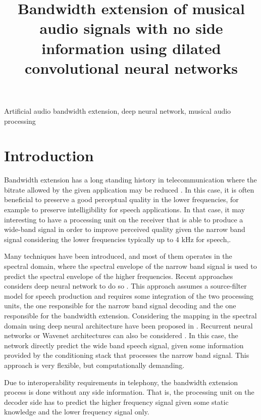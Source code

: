 \documentclass{article}
\title{Bandwidth extension of musical audio signals with no side information using dilated convolutional neural networks}
\begin{document}
%
\maketitle
%
\begin{abstract}

\end{abstract}
%
\begin{keywords}
Artificial audio bandwidth extension, deep neural network, musical audio processing
\end{keywords}
%
\section{Introduction}
\label{sec:intro}

Bandwidth extension has a long standing history in telecommunication where the bitrate allowed by the given application may be reduced \cite{larsen2005audio}. In this case, it is often beneficial to preserve a good perceptual quality in the lower frequencies, for example to preserve intelligibility for speech applications. In that case, it may interesting to have a processing unit on the receiver that is able to produce a wide-band signal in order to improve perceived quality given the narrow band signal considering the lower frequencies typically up to 4 kHz for speech,.

Many techniques have been introduced, and most of them operates in the spectral domain, where the spectral envelope of the narrow band signal is used to predict the spectral envelope of the higher frequencies. Recent approaches considers deep neural network to do so \cite{abel2017artificial}. This approach assumes a source-filter model for speech production and requires some integration of the two processing units, the one responsible for the narrow band signal decoding and the one responsible for the bandwidth extension. Considering the mapping in the spectral domain using deep neural architecture have been proposed in \cite{li2015deep}. Recurrent neural networks \cite{ling2018waveform} or Wavenet architectures can also be considered \cite{gupta2019speech}. In this case, the network directly predict the wide band speech signal, given some information provided by the conditioning stack that processes the narrow band signal. This approach is very flexible, but computationally demanding.

Due to interoperability requirements in telephony, the bandwidth extension process is done without any side information. That is, the processing unit on the decoder side has to predict the higher frequency signal given some static knowledge and the lower frequency signal only.
\end{document}
